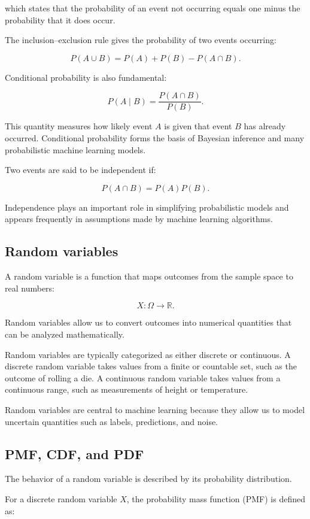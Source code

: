 \documentclass{article}
\begin{document}
which states that the probability of an event not occurring equals one minus the probability that it does occur.

The inclusion–exclusion rule gives the probability of two events occurring:

\[
P(A \cup B) = P(A) + P(B) - P(A \cap B).
\]

Conditional probability is also fundamental:

\[
P(A \mid B) = \frac{P(A \cap B)}{P(B)}.
\]

This quantity measures how likely event $A$ is given that event $B$ has already occurred. Conditional probability forms the basis of Bayesian inference and many probabilistic machine learning models.

Two events are said to be independent if:

\[
P(A \cap B) = P(A)P(B).
\]

Independence plays an important role in simplifying probabilistic models and appears frequently in assumptions made by machine learning algorithms.

\subsection{Random variables}

A random variable is a function that maps outcomes from the sample space to real numbers:

\[
X : \Omega \to \mathbb{R}.
\]

Random variables allow us to convert outcomes into numerical quantities that can be analyzed mathematically.

Random variables are typically categorized as either discrete or continuous. A discrete random variable takes values from a finite or countable set, such as the outcome of rolling a die. A continuous random variable takes values from a continuous range, such as measurements of height or temperature.

Random variables are central to machine learning because they allow us to model uncertain quantities such as labels, predictions, and noise.

\subsection{PMF, CDF, and PDF}

The behavior of a random variable is described by its probability distribution.

For a discrete random variable $X$, the probability mass function (PMF) is defined as:
\end{document}
